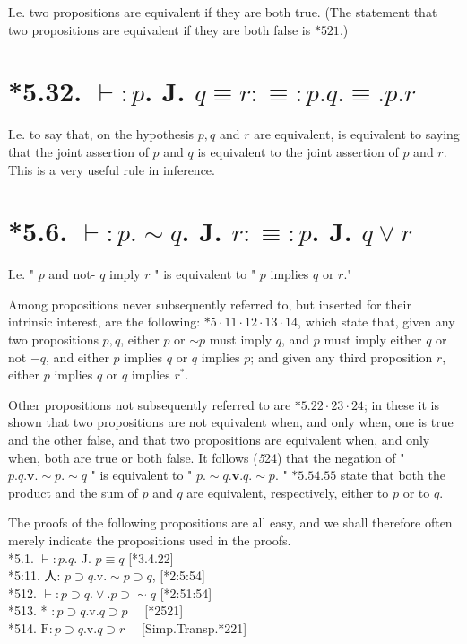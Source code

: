 \documentclass[10pt]{article}
\begin{document}
I.e. two propositions are equivalent if they are both true. (The statement that two propositions are equivalent if they are both false is $* 521$.)

\section*{*5.32. $\vdash: p$. J. $q \equiv r: \equiv: p . q . \equiv . p . r$}
I.e. to say that, on the hypothesis $p, q$ and $r$ are equivalent, is equivalent to saying that the joint assertion of $p$ and $q$ is equivalent to the joint assertion of $p$ and $r$. This is a very useful rule in inference.

\section*{*5.6. $\vdash: p . \sim q$. J. $r: \equiv: p$. J. $q \vee r$}
I.e. " $p$ and not- $q$ imply $r$ " is equivalent to " $p$ implies $q$ or $r$."

Among propositions never subsequently referred to, but inserted for their intrinsic interest, are the following: $* 5 \cdot 11 \cdot 12 \cdot 13 \cdot 14$, which state that, given any two propositions $p, q$, either $p$ or $\sim p$ must imply $q$, and $p$ must imply either $q$ or not $-q$, and either $p$ implies $q$ or $q$ implies $p$; and given any third proposition $r$, either $p$ implies $q$ or $q$ implies $r^{*}$.

Other propositions not subsequently referred to are $* 5.22 \cdot 23 \cdot 24$; in these it is shown that two propositions are not equivalent when, and only when, one is true and the other false, and that two propositions are equivalent when, and only when, both are true or both false. It follows (\textit{5}24) that the negation of " $p . q . \mathbf{v} . \sim p . \sim q$ " is equivalent to " $p . \sim q . \mathbf{v} . q . \sim p$. " $* 5.54 .55$ state that both the product and the sum of $p$ and $q$ are equivalent, respectively, either to $p$ or to $q$.

The proofs of the following propositions are all easy, and we shall therefore often merely indicate the propositions used in the proofs.\\
*5.1. $\vdash: p . q$. J. $p \equiv q$ [*3.4.22]\\
*5:11. 人: $p \supset q . \mathrm{v} . \sim p \supset q$, [*2:5:54]\\
*512. $\vdash: p \supset q . \vee . p \supset \sim q$ [*2:51:54]\\
*513. * $: p \supset q . \mathrm{v} . q \supset p \quad$ [*2521]\\
*514. $\mathrm{F}: p \supset q . \mathrm{v} . q \supset r \quad$ [Simp.Transp.*221]
\end{document}
